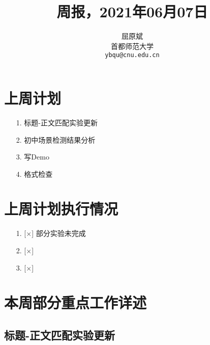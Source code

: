 \documentclass[11pt]{article}
\title{周报，2021年06月07日}
\author{屈原斌 \\
  首都师范大学 \\
    {\tt ybqu@cnu.edu.cn}}
\date{}
\begin{document}
\begin{CJK}{UTF8}{gkai}

\maketitle
\CJKindent

\section{上周计划}


\begin{itemize}
  \item [1.] 标题-正文匹配实验更新
  \item [2.] 初中场景检测结果分析
  \item [3.] 写Demo
  \item [4.] 格式检查
\end{itemize}


\section{上周计划执行情况}
\begin{itemize}
\item [1.] [$\times$] 部分实验未完成
\item [2.] [$\times$] 
\item [3.] [$\times$] 
\end{itemize}

\section{本周部分重点工作详述}

\subsection{标题-正文匹配实验更新}


\end{CJK}
\end{document}
